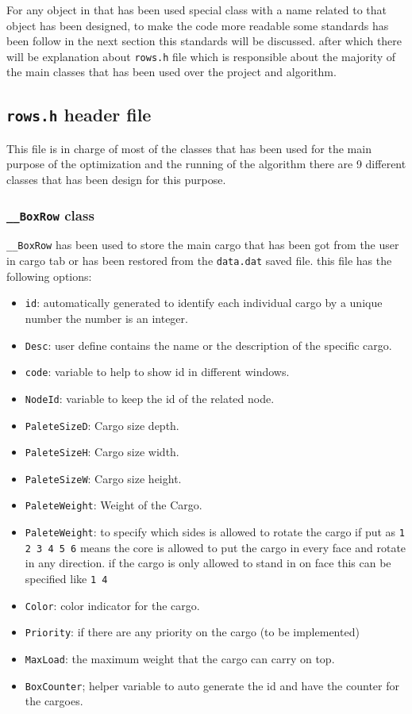 \documentclass[oneside,titlepage,12pt]{memoir}
\begin{document}
For any object in that has been used special class with a name related
to that object has been designed, to make the code more readable some
standards has been follow in the next section this standards will be
discussed. after which there will be explanation about \texttt{rows.h}
file which is responsible about the majority of the main classes that
has been used over the project and algorithm.

\subsection{\texttt{rows.h} header
file}\label{rows.h-header-file}

This file is in charge of most of the classes that has been used for the
main purpose of the optimization and the running of the algorithm there
are 9 different classes that has been design for this purpose.


\subsubsection{\texttt{\_\_BoxRow} class}\label{boxrow-class}

\texttt{\_\_BoxRow} has been used to store the main cargo that has been
got from the user in cargo tab or has been restored from the
\texttt{data.dat} saved file. this file has the following options:

\begin{itemize}
\itemsep1pt\parskip0pt
\item
  \texttt{id}: automatically generated to identify each individual cargo
  by a unique number the number is an integer.
\item
  \texttt{Desc}: user define contains the name or the description of the
  specific cargo.
\item
  \texttt{code}: variable to help to show id in different windows.
\item
  \texttt{NodeId}: variable to keep the id of the related node.
\item
  \texttt{PaleteSizeD}: Cargo size depth.
\item
  \texttt{PaleteSizeH}: Cargo size width.
\item
  \texttt{PaleteSizeW}: Cargo size height.
\item
  \texttt{PaleteWeight}: Weight of the Cargo.
\item
  \texttt{PaleteWeight}: to specify which sides is allowed to rotate the
  cargo if put as \texttt{1 2 3 4 5 6} means the core is allowed to put
  the cargo in every face and rotate in any direction. if the cargo is
  only allowed to stand in on face this can be specified like
  \texttt{1 4}
\item
  \texttt{Color}: color indicator for the cargo.
\item
  \texttt{Priority}: if there are any priority on the cargo (to be
  implemented)
\item
  \texttt{MaxLoad}: the maximum weight that the cargo can carry on top.
\item
  \texttt{BoxCounter}; helper variable to auto generate the id and have
  the counter for the cargoes.
\end{itemize}
\end{document}
